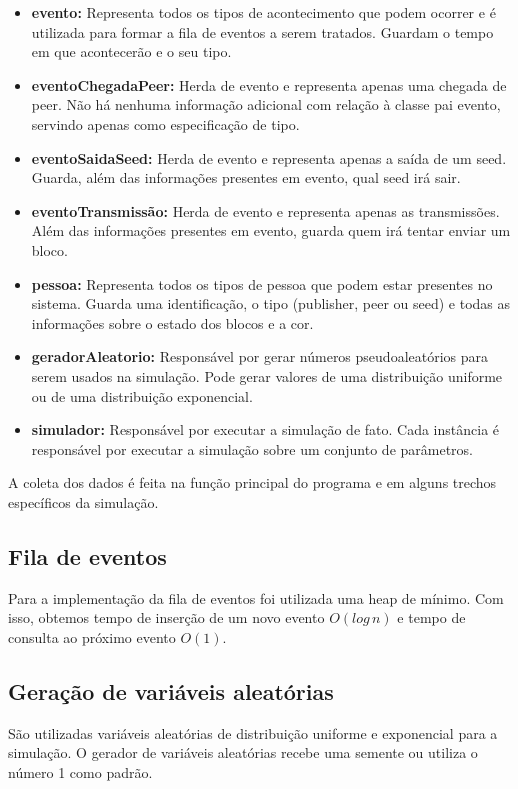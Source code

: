 \documentclass[a4paper,10pt]{article}
\begin{document}
\begin{itemize}
	\item \textbf{evento:} Representa todos os tipos de acontecimento que podem ocorrer e é utilizada para formar a fila de eventos a serem tratados. Guardam o tempo em que acontecerão e o seu tipo.
	\item \textbf{eventoChegadaPeer:} Herda de evento e representa apenas uma chegada de peer. Não há nenhuma informação adicional com relação à classe pai evento, servindo apenas como especificação de tipo.
	\item \textbf{eventoSaidaSeed:} Herda de evento e representa apenas a saída de um seed. Guarda, além das informações presentes em evento, qual seed irá sair.
	\item \textbf{eventoTransmissão:} Herda de evento e representa apenas as transmissões. Além das informações presentes em evento, guarda quem irá tentar enviar um bloco.
	\item \textbf{pessoa:} Representa todos os tipos de pessoa que podem estar presentes no sistema. Guarda uma identificação, o tipo (publisher, peer ou seed) e todas as informações sobre o estado dos blocos e a cor.
	\item \textbf{geradorAleatorio:} Responsável por gerar números pseudoaleatórios para serem usados na simulação. Pode gerar valores de uma distribuição uniforme ou de uma distribuição exponencial.
	\item \textbf{simulador:} Responsável por executar a simulação de fato. Cada instância é responsável por executar a simulação sobre um conjunto de parâmetros.
\end{itemize}

A coleta dos dados é feita na função principal do programa e em alguns trechos específicos da simulação.

\subsection{Fila de eventos}

Para a implementação da fila de eventos foi utilizada uma heap de mínimo. Com isso, obtemos tempo de inserção de um novo evento $O(log\,n)$ e tempo de consulta ao próximo evento $O(1)$.

\subsection{Geração de variáveis aleatórias}

São utilizadas variáveis aleatórias de distribuição uniforme e exponencial para a simulação. O gerador de variáveis aleatórias recebe uma semente ou utiliza o número 1 como padrão.
\end{document}
